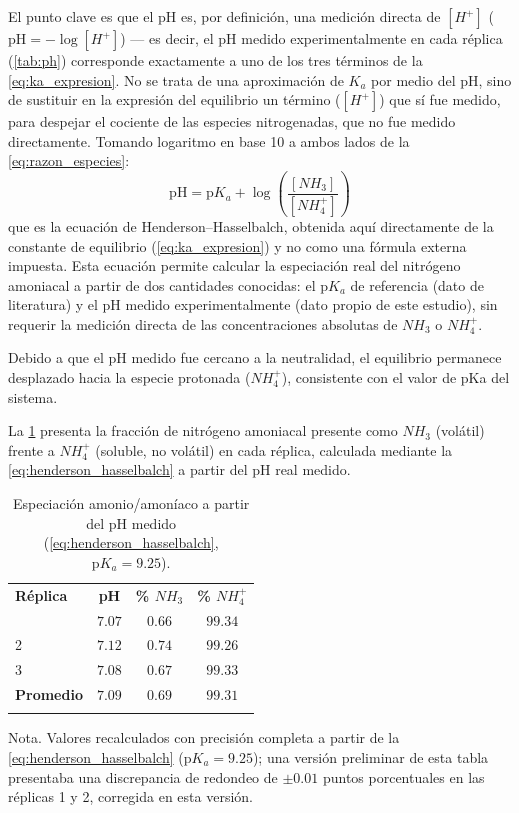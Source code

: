 \documentclass[fleqn]{jaes}
\begin{document}
El punto clave es que el pH es, por definición, una medición directa de $[H^+]$ ($\text{pH} = -\log[H^+]$) --- es decir, el pH medido experimentalmente en cada réplica (\cref{tab:ph}) corresponde exactamente a uno de los tres términos de la \cref{eq:ka_expresion}. No se trata de una aproximación de $K_a$ por medio del pH, sino de sustituir en la expresión del equilibrio un término ($[H^+]$) que sí fue medido, para despejar el cociente de las especies nitrogenadas, que no fue medido directamente. Tomando logaritmo en base 10 a ambos lados de la \cref{eq:razon_especies}:
\begin{equation}
\text{pH} = \text{p}K_a + \log\left(\frac{[NH_3]}{[NH_4^+]}\right)
\label{eq:henderson_hasselbalch}
\end{equation}
que es la ecuación de Henderson--Hasselbalch, obtenida aquí directamente de la constante de equilibrio (\cref{eq:ka_expresion}) y no como una fórmula externa impuesta. Esta ecuación permite calcular la especiación real del nitrógeno amoniacal a partir de dos cantidades conocidas: el $\text{p}K_a$ de referencia (dato de literatura) y el pH medido experimentalmente (dato propio de este estudio), sin requerir la medición directa de las concentraciones absolutas de $NH_3$ o $NH_4^+$.

Debido a que el pH medido fue cercano a la neutralidad, el equilibrio permanece desplazado hacia la especie protonada ($NH_4^+$), consistente con el valor de pKa del sistema.

La \cref{tab:especiacion_nh3} presenta la fracción de nitrógeno amoniacal presente como $NH_3$ (volátil) frente a $NH_4^+$ (soluble, no volátil) en cada réplica, calculada mediante la \cref{eq:henderson_hasselbalch} a partir del pH real medido.

\begin{table}[!ht]
\centering
\small
\caption{Especiación amonio/amoníaco a partir del pH medido (\cref{eq:henderson_hasselbalch}, $\text{p}K_a=9.25$).}\label{tab:especiacion_nh3}
\begin{tabular}{@{}lccc@{}}
\toprule
\textbf{Réplica} & \textbf{pH} & \textbf{\% $NH_3$} & \textbf{\% $NH_4^+$} \\
\colrule
1 & $7.07$ & $0.66$ & $99.34$ \\
2 & $7.12$ & $0.74$ & $99.26$ \\
3 & $7.08$ & $0.67$ & $99.33$ \\
\colrule
\textbf{Promedio} & $7.09$ & $0.69$ & $99.31$ \\
\botrule
\end{tabular}
\begin{tabnote}
Nota. Valores recalculados con precisión completa a partir de la \cref{eq:henderson_hasselbalch} ($\text{p}K_a=9.25$); una versión preliminar de esta tabla presentaba una discrepancia de redondeo de $\pm 0.01$ puntos porcentuales en las réplicas 1 y 2, corregida en esta versión.
\end{tabnote}
\end{table}
\end{document}
